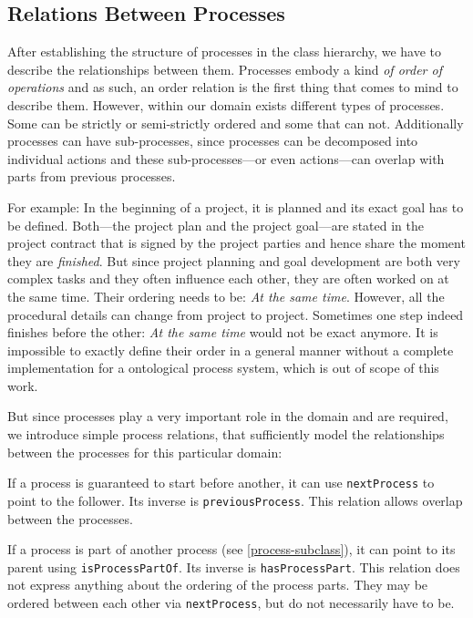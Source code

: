 \documentclass[a4paper, DIV=13, BCOR=0cm]{scrbook}
\newcommand{\relation}[1]{\texttt{#1}}
\begin{document}
\subsection{Relations Between Processes}
After establishing the structure of processes in the class hierarchy, we have to describe the relationships between them. Processes embody a kind \textit{of order of operations} and as such, an order relation is the first thing that comes to mind to describe them. However, within our domain exists different types of processes. Some can be strictly or semi-strictly ordered and some that can not. Additionally processes can have sub-processes, since processes can be decomposed into individual actions and these sub-processes---or even actions---can overlap with parts from previous processes.

For example: In the beginning of a project, it is planned and its exact goal has to be defined. Both---the project plan and the project goal---are stated in the project contract that is signed by the project parties and hence share the moment they are \textit{finished}. But since project planning and goal development are both very complex tasks and they often influence each other, they are often worked on at the same time. Their ordering needs to be: \textit{At the same time}. However, all the procedural details can change from project to project. Sometimes one step indeed finishes before the other: \textit{At the same time} would not be exact anymore. It is impossible to exactly define their order in a general manner without a complete implementation for a ontological process system, which is out of scope of this work.

But since processes play a very important role in the domain and are required, we introduce simple process relations, that sufficiently model the relationships between the processes for this particular domain:
\begin{compactenum}
	\item If a process is guaranteed to start before another, it can use \relation{nextProcess} to point to the follower. Its inverse is \relation{previousProcess}. This relation allows overlap between the processes.
	\item If a process is part of another process (see \autoref{process-subclass}), it can point to its parent using \relation{isProcessPartOf}. Its inverse is \relation{hasProcessPart}. This relation does not express anything about the ordering of the process parts. They may be ordered between each other via \relation{nextProcess}, but do not necessarily have to be.
\end{compactenum}
\end{document}

